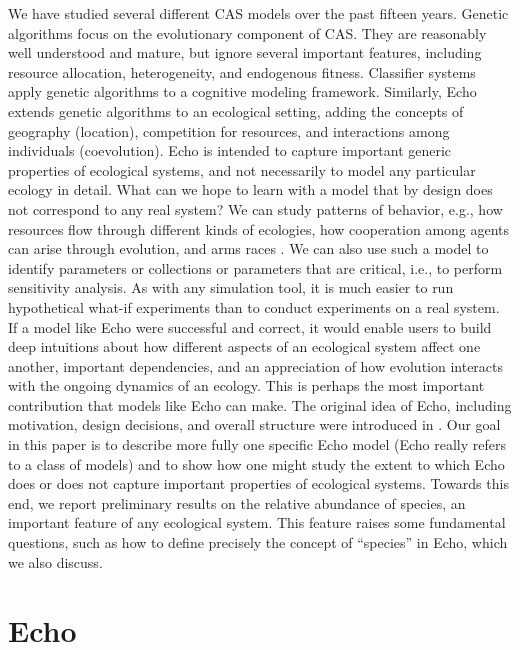 We have studied several different CAS models over the past fifteen
years.  Genetic algorithms \cite{Holland92} focus on the evolutionary
component of CAS.  They are reasonably well understood and mature, but
ignore several important features, including resource allocation,
heterogeneity, and endogenous fitness.  Classifier systems
\cite{HollandEtAl86,Forrest91a}
apply genetic algorithms to a cognitive modeling framework.
Similarly, Echo extends genetic algorithms to an ecological setting,
adding the concepts of geography (location), competition for
resources, and interactions among individuals (coevolution).  Echo is
intended to capture important generic properties of ecological
systems, and not necessarily to model any particular ecology in
detail.  What can we hope to learn with a model that by design does
not correspond to any real system?  We can study patterns of behavior,
e.g., how resources flow through different kinds of ecologies, how
cooperation among agents can arise through evolution, and arms races
\cite{Holland94}.  We can also use such a model to identify 
parameters or collections or parameters that are critical, i.e., to
perform sensitivity analysis.  As with any simulation tool, it is much
easier to run hypothetical what-if experiments than to conduct
experiments on a real system.  If a model like Echo were successful
and correct, it would enable users to build deep intuitions about how
different aspects of an ecological system affect one another,
important dependencies, and an appreciation of how evolution interacts
with the ongoing dynamics of an ecology.  This is perhaps the most
important contribution that models like Echo can make.  The original
idea of Echo, including motivation, design decisions, and overall
structure were introduced in \cite{Holland92,Holland94}.  Our goal in
this paper is to describe more fully one specific Echo model (Echo
really refers to a class of models) and to show how one might study
the extent to which Echo does or does not capture important properties
of ecological systems.  Towards this end, we report preliminary
results on the relative abundance of species, an important feature of
any ecological system.  This feature raises some fundamental
questions, such as how to define precisely the concept of ``species''
in Echo, which we also discuss.


\section{Echo}


